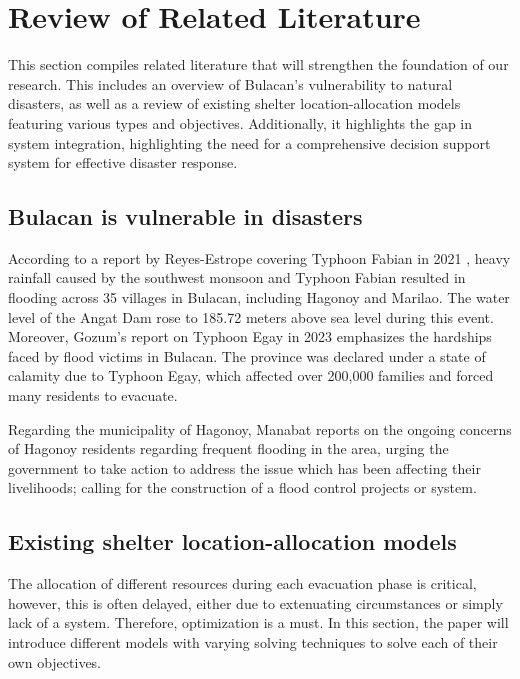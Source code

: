 \section{Review of Related Literature}

This section compiles related literature that will strengthen the foundation of our research. This includes an overview of Bulacan's vulnerability to natural disasters, as well as a review of existing shelter location-allocation models featuring various types and objectives. Additionally, it highlights the gap in system integration, highlighting the need for a comprehensive decision support system for effective disaster response.

\subsection{Bulacan is vulnerable in disasters}

According to a report by Reyes-Estrope covering Typhoon Fabian in 2021 \parencite{Carmela2021}, heavy rainfall caused by the southwest monsoon and Typhoon Fabian resulted in flooding across 35 villages in Bulacan, including Hagonoy and Marilao. The water level of the Angat Dam rose to 185.72 meters above sea level during this event. Moreover, Gozum's report on Typhoon Egay in 2023 \parencite{Iya2023} emphasizes the hardships faced by flood victims in Bulacan. The province was declared under a state of calamity due to Typhoon Egay, which affected over 200,000 families and forced many residents to evacuate.

Regarding the municipality of Hagonoy, Manabat reports on the ongoing concerns of Hagonoy residents regarding frequent flooding in the area, urging the government to take action to address the issue which has been affecting their livelihoods; calling for the construction of a flood control projects or system. \parencite{Jacque2022}

\subsection{Existing shelter location-allocation models}

The allocation of different resources during each evacuation phase is critical, however, this is often delayed, either due to extenuating circumstances or simply lack of a system. Therefore, optimization is a must. In this section, the paper will introduce different models with varying solving techniques to solve each of their own objectives.

